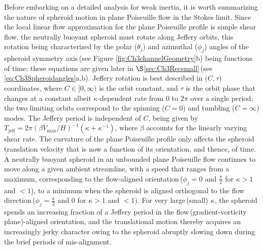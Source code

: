 \documentclass{jfm}
\begin{document}
Before embarking on a detailed analysis for weak inertia, it is worth summarizing the nature of spheroid motion in plane Poiseuille flow in the Stokes limit. Since the local linear flow approximation for the plane Poiseuille profile is simple shear flow, the neutrally buoyant spheroid must rotate along Jeffery orbits\citep{jeffery}, this rotation being characterized by the polar ($\theta_j$) and azimuthal ($\phi_j$) angles of the spheroid symmetry axis\,(see Figure \ref{fig:Ch3channelGeometry}b) being functions of time; these equations are given later in $\S$\ref{sec:Ch3Recsmall}\,(see \ref{eq:Ch3Spheroidangles}a,b). Jeffery rotation is best described in $(C,\tau$) coordinates, where $C\in[0,\infty)$ is the orbit constant, and $\tau$ is the orbit phase that changes at a constant albeit $\kappa$-dependent rate from $0$ to $2\pi$ over a single period\citep{leal1971,navaneeth2016}; the two limiting orbits correspond to the spinning ($C=0$) and tumbling ($C=\infty$) modes. The Jeffery period is independent of $C$, being given by $T_\text{jeff}=2\pi(\beta V_\text{max}/H)^{-1} (\kappa+\kappa^{-1})$, where $\beta$ accounts for the linearly varying shear rate. The curvature of the plane Poiseuille profile only affects the spheroid translation velocity that is now a function of its orientation, and thence, of time. A neutrally buoyant spheroid in an unbounded plane Poiseuille flow continues to move along a given ambient streamline, with a speed that ranges from a maximum, corresponding to the flow-aligned orientation\,($\phi_j=0$ and $\frac{\pi}{2}$ for $\kappa >1$ and $<1$), to a minimum when the spheroid is aligned orthogonal to the flow direction\,($\phi_j=\frac{\pi}{2}$ and $0$ for $\kappa >1$ and $<1$)\citep{chwang1975}. For very large\,(small) $\kappa$, the spheroid spends an increasing fraction of a Jeffery period in the flow\,(gradient-vorticity plane)-aligned orientation, and the translational motion thereby acquires an increasingly jerky character owing to the spheroid abruptly slowing down during the brief periods of mis-alignment. 
\end{document}
